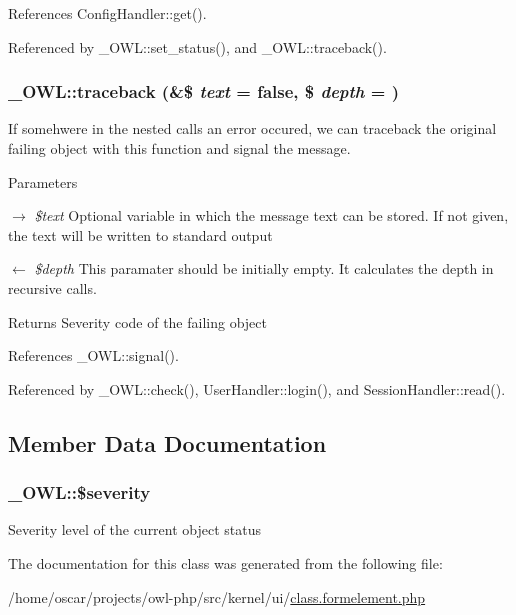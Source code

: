 References ConfigHandler::get().



Referenced by \_\-OWL::set\_\-status(), and \_\-OWL::traceback().

\subsubsection[{traceback}]{\setlength{\rightskip}{0pt plus 5cm}\_\-OWL::traceback (\&\$ {\em text} = {\ttfamily false}, \/  \$ {\em depth} = {})}\label{class__OWL_aa29547995d6741b7d2b90c1d4ea99a13}
If somehwere in the nested calls an error occured, we can traceback the original failing object with this function and signal the message.


\begin{DoxyParams}{Parameters}
\item[\mbox{$\rightarrow$} {\em \$text}]Optional variable in which the message text can be stored. If not given, the text will be written to standard output \item[\mbox{$\leftarrow$} {\em \$depth}]This paramater should be initially empty. It calculates the depth in recursive calls. \end{DoxyParams}
\begin{DoxyReturn}{Returns}
Severity code of the failing object 
\end{DoxyReturn}


References \_\-OWL::signal().



Referenced by \_\-OWL::check(), UserHandler::login(), and SessionHandler::read().



\subsection{Member Data Documentation}
\subsubsection[{\$severity}]{\setlength{\rightskip}{0pt plus 5cm}\_\-OWL::\$severity}\label{class__OWL_ad26b40a9dbbacb33e299b17826f8327c}
Severity level of the current object status 

The documentation for this class was generated from the following file:\begin{DoxyCompactItemize}
\item 
/home/oscar/projects/owl-\/php/src/kernel/ui/\hyperlink{class_8formelement_8php}{class.formelement.php}\end{DoxyCompactItemize}
